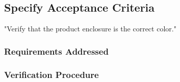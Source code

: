 

\subsection{Specify Acceptance Criteria}
"Verify that the product enclosure is the correct color."

\subsubsection{Requirements Addressed}

\subsubsection{Verification Procedure}


